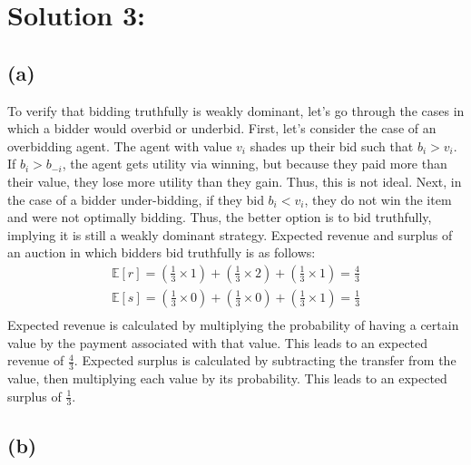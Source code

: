 \documentclass[10pt,a4paper]{article}
\begin{document}
\section{Solution 3:}
  \subsection{(a)}
    To verify that bidding truthfully is weakly dominant, let's go through the cases in which a bidder would overbid or underbid. First, let's consider the case of an overbidding agent. The agent with value $v_i$ shades up their bid such that $b_i>v_i$. If $b_i>b_{-i}$, the agent gets utility via winning, but because they paid more than their value, they lose more utility than they gain. Thus, this is not ideal. Next, in the case of a bidder under-bidding, if they bid $b_i<v_i$, they do not win the item and were not optimally bidding. Thus, the better option is to bid truthfully, implying it is still a weakly dominant strategy.
    Expected revenue and surplus of an auction in which bidders bid truthfully is as follows:
    \begin{gather*}
      \mathbb{E}[r] = (\frac{1}{3}\times1) + (\frac{1}{3}\times2) +
      (\frac{1}{3}\times1) = \frac{4}{3} \\ 
      \mathbb{E}[s] = (\frac{1}{3}\times0) + (\frac{1}{3}\times0) +
      (\frac{1}{3}\times1) = \frac{1}{3} \\
    \end{gather*}
    Expected revenue is calculated by multiplying the probability of having a certain value by the payment associated with that value. This leads to an expected revenue of $\frac{4}{3}$. Expected surplus is calculated by subtracting the transfer from the value, then multiplying each value by its probability. This leads to an expected surplus of $\frac{1}{3}$.
  \subsection{(b)}
    
\end{document}
